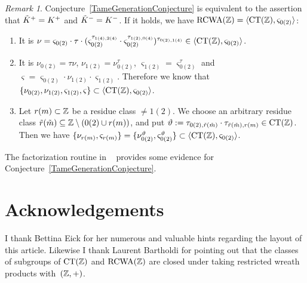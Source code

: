 \documentclass{amsart}
\theoremstyle{definition} \newtheorem{CTZDefinition}{Definition}[section]
\theoremstyle{plain}      \newtheorem{CTZPropertiesTheorem}[CTZDefinition]{Theorem}
\theoremstyle{plain}      \newtheorem{CTZSubgroupsTheorem}[CTZDefinition]{Theorem}
\theoremstyle{definition} \newtheorem{RcwaMappingDefinition}{Definition}[section]
\theoremstyle{definition} \newtheorem{RCWADefinition}[RcwaMappingDefinition]{Definition}
\theoremstyle{plain}      \newtheorem{CTZNotFinitelyGeneratedTheorem}
\theoremstyle{definition} \newtheorem{CTZSmEmbeddingDefinition}[RcwaMappingDefinition]{Definition}
\theoremstyle{plain}      \newtheorem{CTZHighlyTransitiveTheorem}[RcwaMappingDefinition]{Theorem}
\theoremstyle{plain}      \newtheorem{CTZTorsionElementsDivisibleTheorem}
\theoremstyle{plain}      \newtheorem{CTLemma}{Lemma}[section]
\theoremstyle{plain}      \newtheorem{IntegralCommutatorLemma}[CTLemma]{Lemma}
\theoremstyle{plain}      \newtheorem{NormalSubgroupContainsIntegralElementLemma}[CTLemma]{Lemma}
\theoremstyle{plain}      \newtheorem{CTZSimpleTheorem}[CTLemma]{Theorem}
\theoremstyle{remark}     \newtheorem{CTZSimpleRemark}[CTLemma]{Remark}
\theoremstyle{definition} \newtheorem{CTPZDefinition}[CTLemma]{Definition}
\theoremstyle{plain}      \newtheorem{CTPZSimpleCorollary}[CTLemma]{Corollary}
\theoremstyle{plain}      \newtheorem{CTPZSimpleProblem}[CTLemma]{Problem}
\theoremstyle{plain}      \newtheorem{FnPSL2ZEmbeddingTheorem}{Theorem}[section]
\theoremstyle{plain}      \newtheorem{FreeProductEmbeddingTheorem}[FnPSL2ZEmbeddingTheorem]{Theorem}
\theoremstyle{definition} \newtheorem{RestrictionMonomorphismDefinition}
\theoremstyle{plain}      \newtheorem{DirectAndWreathProductsEmbeddingTheorem}
\theoremstyle{plain}      \newtheorem{DirectAndWreathProductsEmbeddingCorollary}
\theoremstyle{definition} \newtheorem{CTintZDefinition}[FnPSL2ZEmbeddingTheorem]{Definition}
\theoremstyle{plain}      \newtheorem{CTintZSimpleTheorem}[FnPSL2ZEmbeddingTheorem]{Theorem}
\theoremstyle{definition} \newtheorem{KernelDefinition}{Definition}[section]
\theoremstyle{definition} \newtheorem{TameWildDefinition}[KernelDefinition]{Definition}
\theoremstyle{definition} \newtheorem{SimpleSupergroupsDefinition}[KernelDefinition]{Definition}
\theoremstyle{definition} \newtheorem{CSCRDefinition}[KernelDefinition]{Definition}
\theoremstyle{plain}      \newtheorem{SimpleSupergroupsGeneratorsTheorem}[KernelDefinition]{Theorem}
\theoremstyle{plain}      \newtheorem{SimpleSupergroupsTheorem}[KernelDefinition]{Theorem}
\theoremstyle{plain}      \newtheorem{SimpleSupergroupsTransitivityTheorem}
\theoremstyle{plain}      \newtheorem{TameGenerationConjecture}[KernelDefinition]{Conjecture}
\theoremstyle{remark}     \newtheorem{TameGenerationRemark}[KernelDefinition]{Remark}
\begin{document}
\begin{TameGenerationRemark} \label{TameGenerationRemark}
  Conjecture~\ref{TameGenerationConjecture} is equivalent to the assertion that
  \(\tilde{K}^+ = K^+\) and \(\tilde{K}^- = K^-\). If it holds, we have
  \(\RCWA{\ZZ} = \langle \CT{\ZZ}, \varsigma_{0(2)} \rangle\):
  \begin{enumerate}

    \item It is \(\nu = \varsigma_{0(2)} \cdot \tau \cdot
          (\varsigma_{0(2)}^{\tau_{1(4),2(4)}} \cdot
           \varsigma_{0(2)}^{\tau_{1(2),0(4)}})^{\tau_{0(2),1(4)}}
          \in \langle \CT{\ZZ}, \varsigma_{0(2)} \rangle\).

    \item It is \(\nu_{0(2)} = \tau \nu\), \(\nu_{1(2)} = \nu_{0(2)}^\tau\),
          \(\varsigma_{1(2)} = \varsigma_{0(2)}^\tau\) and 
          \(\varsigma = \varsigma_{0(2)} \cdot \nu_{1(2)} \cdot \varsigma_{1(2)}\).
          Therefore we know that \(\{\nu_{0(2)}, \nu_{1(2)}, \varsigma_{1(2)}, \varsigma\}
          \subset \langle \CT{\ZZ}, \varsigma_{0(2)} \rangle\).

    \item Let \(r(m) \subset \mathbb{Z}\) be a residue class \(\neq 1(2)\). We choose an arbitrary
          residue class \(\tilde{r}(\tilde{m}) \subseteq \mathbb{Z} \setminus (0(2) \cup r(m))\), and put
          \(\vartheta := \tau_{0(2),\ti{r}(\ti{m})} \cdot \tau_{\ti{r}(\ti{m}),r(m)} \in \CT{\ZZ}\).
          Then we have \(\{\nu_{r(m)}, \varsigma_{r(m)}\} = \{\nu_{0(2)}^\vartheta,
          \varsigma_{0(2)}^\vartheta\} \subset \langle \CT{\ZZ}, \varsigma_{0(2)} \rangle\).

  \end{enumerate}
  The factorization routine in \RCWAPackage~\cite{Kohl05a} provides some evidence
  for Conjecture~\ref{TameGenerationConjecture}.
\end{TameGenerationRemark}

\section*{Acknowledgements}

I thank Bettina Eick for her numerous and valuable hints regarding the layout of this article.
Likewise I thank Laurent Bartholdi for pointing out that the classes of subgroups
of \(\CT{\ZZ}\) and \(\RCWA{\ZZ}\) are closed under taking restricted wreath products
with~\((\mathbb{Z},+)\).



\end{document}
